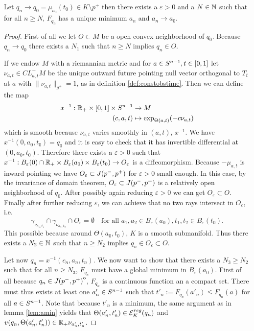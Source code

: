 \begin{proposition}
    Let $q_n\to q_0=\mu_{a_0}(t_0)\in K\setminus p^+$ then there exists a $\varepsilon>0$ and a $N\in \mathbb{N}$ such that for all $n\ge N$, $F_{q_n}$ has a unique minimum $a_n$ and $a_n\to a_0$.
\end{proposition}
\begin{proof}
    First of all we let $O\subset M$ be a open convex neighborhood of $q_0$. Because $q_n \to q_0$ there exists a $N_1$ such that $n\ge N$ implies $q_n \in O$.

    If we endow $M$ with a riemannian metric and for $a\in {S^{n-1}}, t\in [0,1]$ let $\nu_{a,t}\in CL^+_{a,t}M$ be the unique outward future pointing null vector orthogonal to $T_t$ at $a$ with $\lVert \nu_{a,t} \rVert_{g^+}=1$, as in definition \ref{def:constobstime}. Then we can define the map 
    \begin{align*}
        x^{-1}:\mathbb{R}_+\times [0,1] \times {S^{n-1}} &\to M \\
        (c,a,t)&\mapsto \exp_{\Theta(a,t)}(-c\nu_{a,t})
    \end{align*} which is smooth because $\nu_{a,t}$ varies smoothly in $(a,t)$, $x^{-1}$. We have $x^{-1}(0,a_0,t_0)=q_0$ and it is easy to check that it has invertible differential at $(0,a_0,t_0)$. Therefore there exists a $\varepsilon>0$ such that $x^{-1}:B_\varepsilon(0)\cap \mathbb{R}_+ \times B_\varepsilon(a_0) \times B_\varepsilon(t_0) \to O_\varepsilon$ is a diffeomorphism. Because $-\mu_{a,t}$ is inward pointing we have $O_\varepsilon\subset J(p^-,p^+)$ for $\varepsilon>0$ small enough. In this case, by the invariance of domain theorem, $O_\varepsilon\subset J(p^-,p^+)$ is a relatively open neighborhood of $q_0$. After possibly again reducing $\varepsilon>0$ we can get $O_\varepsilon\subset O$. Finally after further reducing $\varepsilon$, we can achieve that no two rays intersect in $O_\varepsilon$, i.e. 
    \[
        \gamma_{\nu_{a_1,t_1}} \cap \gamma_{\nu_{a_2,t_2}} \cap O_\varepsilon=\emptyset \quad  \text{for all } a_1,a_2\in B_\varepsilon(a_0), t_1,t_2 \in B_\varepsilon(t_0).
    \]
    This possible because around $\Theta(a_0,t_0)$, $K$ is a smooth submanifold.
    Thus there exists a $N_2\in \mathbb{N}$ such that $n\ge N_2$ implies $q_n\in O_\varepsilon\subset O$.
    
    Let now $q_n = x^{-1}(c_n,a_n,t_n)$. We now want to show that there exists a $N_3\ge N_2$ such that for all $n\ge N_3$, $F_{q_n}$ must have a global minimum in $B_\varepsilon(a_0)$. First of all because $q_n \in {\kern0ptJ(p^-,p^+)}^{\mathrm{o}}$, $F_{q_n}$ is a continuous function an a compact set. There must thus exists at least one $a'_n\in {S^{n-1}}$ such that $t'_n := F_{q_n}(a'_n) \leq F_{q_n}(a)$ for all $a\in {S^{n-1}}$. Note that because $t'_n$ is a minimum, the same argument as in lemma \ref{lem:amin} yields that $\Theta(a'_n,t_n')\in {{\mathcal{E}}^{reg}_K}(q_n)$ and $v(q_n,\Theta(a'_n,t_n')) \in \mathbb{R}_+\nu_{a_n',t_n'}$.
    

\end{proof}
